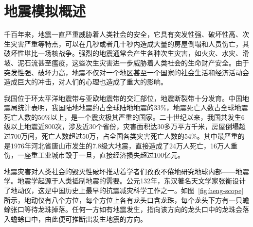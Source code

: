 
\section{地震模拟概述}



千百年来，地震一直严重威胁着人类社会的安全，它具有突发性强、破坏性高、次生灾害严重等特点，可以在几秒或者几十秒内造成大量的房屋倒塌和人员伤亡，其破坏性堪比一场核战争。强烈的地震通常会产生各种次生灾害，如火灾、水灾、滑坡、泥石流甚至瘟疫，这些次生灾害进一步威胁着人类社会的生命财产安全。由于突发性强、破坏力高，地震不仅对一个地区甚至一个国家的社会生活和经济活动会造成巨大的冲击，对人们的心理也造成了重大的影响。

我国位于环太平洋地震带与亚欧地震带的交汇部位，地震断裂带十分发育。中国地震局统计表明，我国陆地地震约占全球陆地地震的33\%，地震死亡人数占全球地震死亡人数的50\%以上，是一个震灾极其严重的国家\cite{地震局}。二十世纪以来，我国共发生6级以上地震近800次，涉及近30个省份，灾害面积达30多万平方千米，房屋倒塌超过700万间，死亡人数超过50万，占全国各类灾害死亡人数的54\%。其中最严重的是1976年河北省唐山市发生的7.8级大地震，直接造成了24万人死亡，16万人重伤，一座重工业城市毁于一旦，直接经济损失超过100亿元\cite{地震局}。

地震灾害对人类社会的毁灭性破坏推动着学者们孜孜不倦地研究地球内部——地震学。地震学起源于人类抵制地震的需要。公元132年，东汉著名天文学家张衡设计了地动仪，这是中国历史上最早的抗震减灾科学工作之一\citep{stein2009introduction}。如图~\ref{fig:heng-scope}所示，地动仪有八个方位，每个方位上各有龙头口含龙珠，每个龙头下方有一只蟾蜍张口等待龙珠掉落。任何一方如有地震发生，指向该方向的龙头口中的龙珠会落入蟾蜍口中，由此便可推断出发生地震的方向\cite{seismoscopewiki}。

